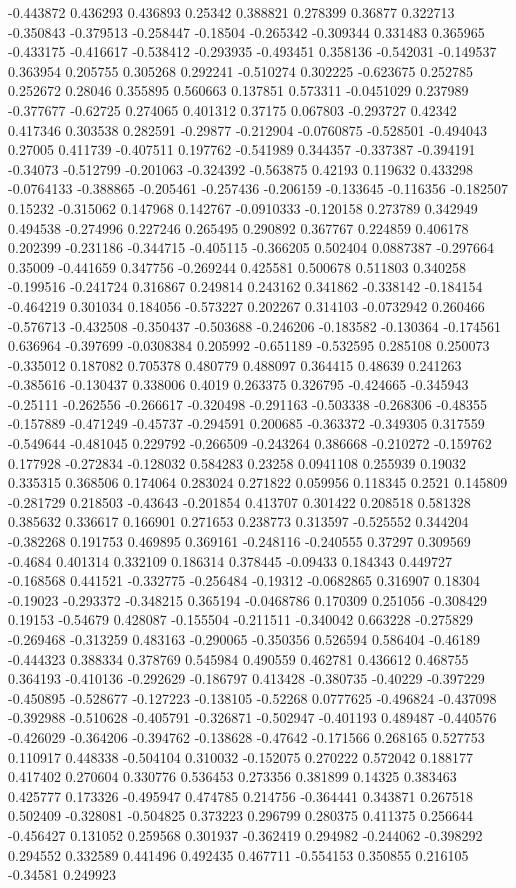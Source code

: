 -0.443872 0.436293 0.436893 0.25342 0.388821 0.278399 0.36877 0.322713 -0.350843 -0.379513 -0.258447 -0.18504 -0.265342 -0.309344 0.331483 0.365965 -0.433175 -0.416617 -0.538412 -0.293935 -0.493451 0.358136 -0.542031 -0.149537 0.363954 0.205755 0.305268 0.292241 -0.510274 0.302225 -0.623675 0.252785 0.252672 0.28046 0.355895 0.560663 0.137851 0.573311 -0.0451029 0.237989 -0.377677 -0.62725 0.274065 0.401312 0.37175 0.067803 -0.293727 0.42342 0.417346 0.303538 0.282591 -0.29877 -0.212904 -0.0760875 -0.528501 -0.494043 0.27005 0.411739 -0.407511 0.197762 -0.541989 0.344357 -0.337387 -0.394191 -0.34073 -0.512799 -0.201063 -0.324392 -0.563875 0.42193 0.119632 0.433298 -0.0764133 -0.388865 -0.205461 -0.257436 -0.206159 -0.133645 -0.116356 -0.182507 0.15232 -0.315062 0.147968 0.142767 -0.0910333 -0.120158 0.273789 0.342949 0.494538 -0.274996 0.227246 0.265495 0.290892 0.367767 0.224859 0.406178 0.202399 -0.231186 -0.344715 -0.405115 -0.366205 0.502404 0.0887387 -0.297664 0.35009 -0.441659 0.347756 -0.269244 0.425581 0.500678 0.511803 0.340258 -0.199516 -0.241724 0.316867 0.249814 0.243162 0.341862 -0.338142 -0.184154 -0.464219 0.301034 0.184056 -0.573227 0.202267 0.314103 -0.0732942 0.260466 -0.576713 -0.432508 -0.350437 -0.503688 -0.246206 -0.183582 -0.130364 -0.174561 0.636964 -0.397699 -0.0308384 0.205992 -0.651189 -0.532595 0.285108 0.250073 -0.335012 0.187082 0.705378 0.480779 0.488097 0.364415 0.48639 0.241263 -0.385616 -0.130437 0.338006 0.4019 0.263375 0.326795 -0.424665 -0.345943 -0.25111 -0.262556 -0.266617 -0.320498 -0.291163 -0.503338 -0.268306 -0.48355 -0.157889 -0.471249 -0.45737 -0.294591 0.200685 -0.363372 -0.349305 0.317559 -0.549644 -0.481045 0.229792 -0.266509 -0.243264 0.386668 -0.210272 -0.159762 0.177928 -0.272834 -0.128032 0.584283 0.23258 0.0941108 0.255939 0.19032 0.335315 0.368506 0.174064 0.283024 0.271822 0.059956 0.118345 0.2521 0.145809 -0.281729 0.218503 -0.43643 -0.201854 0.413707 0.301422 0.208518 0.581328 0.385632 0.336617 0.166901 0.271653 0.238773 0.313597 -0.525552 0.344204 -0.382268 0.191753 0.469895 0.369161 -0.248116 -0.240555 0.37297 0.309569 -0.4684 0.401314 0.332109 0.186314 0.378445 -0.09433 0.184343 0.449727 -0.168568 0.441521 -0.332775 -0.256484 -0.19312 -0.0682865 0.316907 0.18304 -0.19023 -0.293372 -0.348215 0.365194 -0.0468786 0.170309 0.251056 -0.308429 0.19153 -0.54679 0.428087 -0.155504 -0.211511 -0.340042 0.663228 -0.275829 -0.269468 -0.313259 0.483163 -0.290065 -0.350356 0.526594 0.586404 -0.46189 -0.444323 0.388334 0.378769 0.545984 0.490559 0.462781 0.436612 0.468755 0.364193 -0.410136 -0.292629 -0.186797 0.413428 -0.380735 -0.40229 -0.397229 -0.450895 -0.528677 -0.127223 -0.138105 -0.52268 0.0777625 -0.496824 -0.437098 -0.392988 -0.510628 -0.405791 -0.326871 -0.502947 -0.401193 0.489487 -0.440576 -0.426029 -0.364206 -0.394762 -0.138628 -0.47642 -0.171566 0.268165 0.527753 0.110917 0.448338 -0.504104 0.310032 -0.152075 0.270222 0.572042 0.188177 0.417402 0.270604 0.330776 0.536453 0.273356 0.381899 0.14325 0.383463 0.425777 0.173326 -0.495947 0.474785 0.214756 -0.364441 0.343871 0.267518 0.502409 -0.328081 -0.504825 0.373223 0.296799 0.280375 0.411375 0.256644 -0.456427 0.131052 0.259568 0.301937 -0.362419 0.294982 -0.244062 -0.398292 0.294552 0.332589 0.441496 0.492435 0.467711 -0.554153 0.350855 0.216105 -0.34581 0.249923 